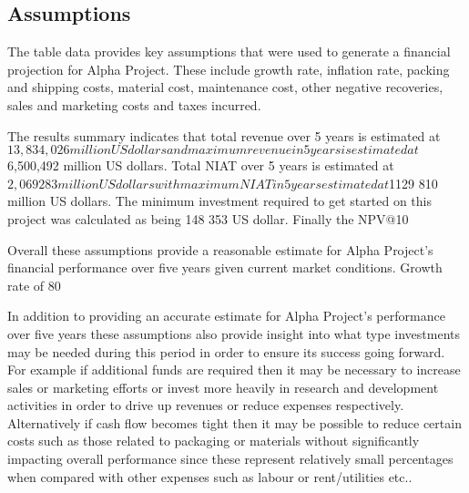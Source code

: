 

\subsection{Assumptions}\label{sec:title}

The table data provides key assumptions that were used to generate a financial projection for Alpha Project. These include growth rate, inflation rate, packing and shipping costs, material cost, maintenance cost, other negative recoveries, sales and marketing costs and taxes incurred. 

The results summary indicates that total revenue over 5 years is estimated at $13,834,026 million US dollars and maximum revenue in 5 years is estimated at $6,500,492 million US dollars. Total NIAT over 5 years is estimated at $2,069283 million US dollars with maximum NIAT in 5 years estimated at $1129 810 million US dollars. The minimum investment required to get started on this project was calculated as being 148 353 US dollar. Finally the NPV@10%

Overall these assumptions provide a reasonable estimate for Alpha Project's financial performance over five years given current market conditions. Growth rate of 80%

In addition to providing an accurate estimate for Alpha Project's performance over five years these assumptions also provide insight into what type investments may be needed during this period in order to ensure its success going forward. For example if additional funds are required then it may be necessary to increase sales or marketing efforts or invest more heavily in research and development activities in order to drive up revenues or reduce expenses respectively. Alternatively if cash flow becomes tight then it may be possible to reduce certain costs such as those related to packaging or materials without significantly impacting overall performance since these represent relatively small percentages when compared with other expenses such as labour or rent/utilities etc.. 

